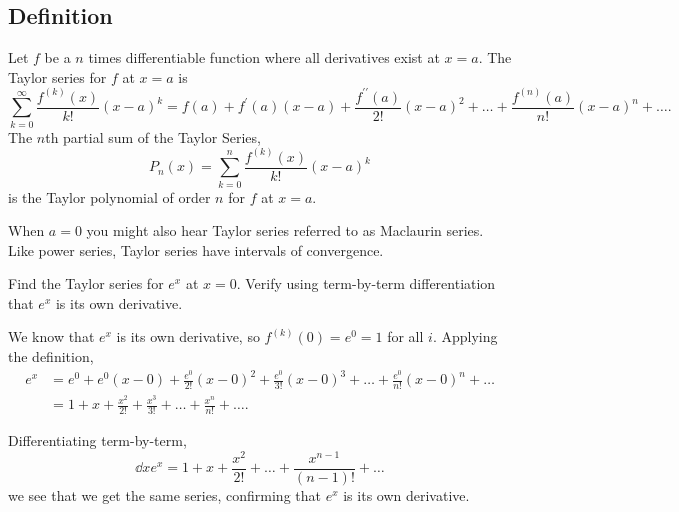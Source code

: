 \subsection{Definition}
\begin{definition}
	Let $f$ be a $n$ times differentiable function where all derivatives exist at $x=a$.
	The Taylor series for $f$ at $x=a$ is
	\begin{equation*}
		\sum_{k=0}^{\infty}{\frac{f^{(k)}(x)}{k!}(x-a)^k} = f(a) + f^\prime(a)(x-a) + \frac{f^{\prime\prime}(a)}{2!}(x-a)^2 + \ldots + \frac{f^{(n)}(a)}{n!}(x-a)^n + \ldots.
	\end{equation*}
	The $n$th partial sum of the Taylor Series,
	\begin{equation*}
		P_n(x) = \sum_{k=0}^{n}{\frac{f^{(k)}(x)}{k!}(x-a)^k}
	\end{equation*}
	is the Taylor polynomial of order $n$ for $f$ at $x=a$.
\end{definition}

When $a=0$ you might also hear Taylor series referred to as Maclaurin series.
Like power series, Taylor series have intervals of convergence.

\begin{example}
	Find the Taylor series for $e^x$ at $x=0$.
	Verify using term-by-term differentiation that $e^x$ is its own derivative.
\end{example}
\begin{answer}
	We know that $e^x$ is its own derivative, so $f^{(k)}(0)=e^0 = 1$ for all $i$.
	Applying the definition,
	\begin{align*}
		e^x &= e^0 + e^0(x-0) + \frac{e^0}{2!}(x-0)^2 + \frac{e^0}{3!}(x-0)^3 + \ldots + \frac{e^0}{n!}(x-0)^n + \ldots \\
		&= 1 + x + \frac{x^2}{2!} + \frac{x^3}{3!} + \ldots + \frac{x^n}{n!} + \ldots.
	\end{align*}
	
	Differentiating term-by-term,
	\begin{equation*}
		\dd{}{x}e^x = 1 + x + \frac{x^2}{2!} + \ldots + \frac{x^{n-1}}{(n-1)!} + \ldots
	\end{equation*}
	we see that we get the same series, confirming that $e^x$ is its own derivative.
\end{answer}

